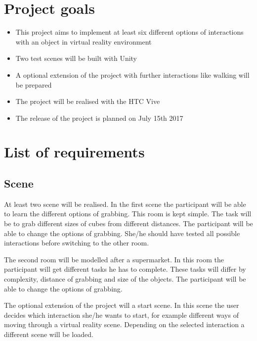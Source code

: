 \documentclass[a4paper, 12pt]{article}
\newcommand{\changefont}[3]{
\fontfamily{#1} \fontseries{#2} \fontshape{#3} \selectfont}
\begin{document}



    
\section{Project goals}

\begin{itemize}
\item This project aims to implement at least six different options of interactions with an object in virtual reality environment 
\item Two test scenes will be built with Unity
\item A optional extension of the project with further interactions like walking will be prepared
\item The project will be realised with the HTC Vive
\item The release of the project is planned on July 15th 2017
\end{itemize}

\section{List of requirements}
\subsection{Scene}
At least two scene will be realised. In the first scene the participant will be able to learn the different options of grabbing. This room is kept simple. The task will be to grab different sizes of cubes from different distances. The participant will be able to change the options of grabbing. She/he should have tested all possible interactions before switching to the other room.

The second room will be modelled after a supermarket. In this room the participant will get different tasks he has to complete. These tasks will differ by complexity, distance of grabbing and size of the objects. The participant will be able to change the options of grabbing.

The optional extension of the project will a start scene. In this scene the user decides which interaction she/he wants to start, for example different ways of moving through a virtual reality scene. Depending on the selected interaction a different scene will be loaded.
\end{document}

